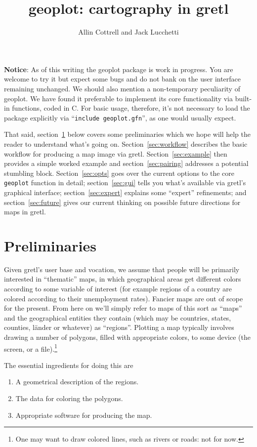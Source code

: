 \documentclass{article}
\title{geoplot: cartography in gretl}
\author{Allin Cottrell and Jack Lucchetti}
\begin{document}
\maketitle

\textbf{Notice}: As of this writing the \textsf{geoplot} package is
work in progress. You are welcome to try it but expect some bugs and
do not bank on the user interface remaining unchanged. We should also
mention a non-temporary peculiarity of \textsf{geoplot}. We have found
it preferable to implement its core functionality via built-in
functions, coded in C. For basic usage, therefore, it's not necessary
to load the package explicitly via ``\texttt{include geoplot.gfn}'',
as one would usually expect.

That said, section~\ref{sec:prelim} below covers some preliminaries
which we hope will help the reader to understand what's going
on. Section~\ref{sec:workflow} describes the basic workflow for
producing a map image via gretl. Section~\ref{sec:example} then
provides a simple worked example and section~\ref{sec:pairing}
addresses a potential stumbling block. Section~\ref{sec:opts} goes
over the current options to the core \texttt{geoplot} function in
detail; section~\ref{sec:gui} tells you what's available via gretl's
graphical interface; section~\ref{sec:expert} explains some ``expert''
refinements; and section~\ref{sec:future} gives our current thinking
on possible future directions for maps in gretl.

\section{Preliminaries}
\label{sec:prelim}

Given gretl's user base and vocation, we assume that people will be
primarily interested in ``thematic'' maps, in which geographical areas
get different colors according to some variable of interest (for
example regions of a country are colored according to their
unemployment rates). Fancier maps are out of scope for the
present. From here on we'll simply refer to maps of this sort as
``maps'' and the geographical entities they contain (which may be
countries, states, counties, l\"ander or whatever) as
``regions''. Plotting a map typically involves drawing a number of
polygons, filled with appropriate colors, to some device (the screen,
or a file).\footnote{One may want to draw colored lines, such as
  rivers or roads: not for now.}

The essential ingredients for doing this are
\begin{enumerate}
   \item A geometrical description of the regions.
   \item The data for coloring the polygons.
   \item Appropriate software for producing the map.
\end{enumerate}
\end{document}
